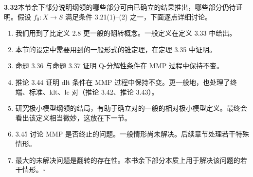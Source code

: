 \par\medskip\noindent\textbf{3.32}\quad 本节余下部分说明纲领的哪些部分可由已确立的结果推出，哪些部分仍待证明。假设 $f_0:X\to S$ 满足条件 3.21(1)--(2) 之一，下面逐点详细讨论。

\begin{enumerate}[label=(\arabic*)]
\item 我们用到了比定义 2.8 更一般的翻转概念。一般定义在定义 3.33 中给出。
\item 本节的设定中需要用到的一般形式的锥定理，在定理 3.35 中证明。
\item 命题 3.36 与命题 3.37 证明 Q-分解性条件在 MMP 过程中保持不变。
\item 推论 3.44 证明 dlt 条件在 MMP 过程中保持不变。更一般地，也处理了终端、标准、klt、lc 对（推论 3.42、推论 3.43）。
\item 研究极小模型纲领的结局，有助于确立对的一般的相对极小模型定义。最终会看出该定义相当微妙，这放在下一节。
\item 3.45 讨论 MMP 是否终止的问题。一般情形尚未解决。后续章节处理若干特殊情形。
\item 最大的未解决问题是翻转的存在性。本书余下部分本质上用于解决该问题的若干情形。\hfill$\square$
\end{enumerate}

